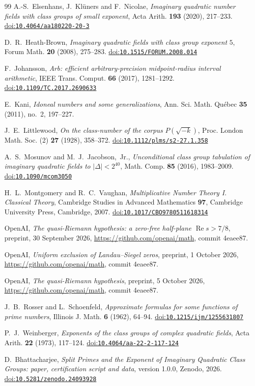 \documentclass[11pt]{amsart}
\theoremstyle{definition}
\theoremstyle{remark}
\numberwithin{equation}{section}
\renewcommand{\Re}{\operatorname{Re}}
\providecommand{\doi}[1]{\href{https://doi.org/#1}{doi:\nolinkurl{#1}}}
\begin{document}
\begin{thebibliography}{99}
 A.-S.~Elsenhans, J.~Kl\"uners and F.~Nicolae, \emph{Imaginary quadratic number fields with class groups of small exponent}, Acta Arith. \textbf{193} (2020), 217--233. \doi{10.4064/aa180220-20-3}

 D.~R.~Heath-Brown, \emph{Imaginary quadratic fields with class group exponent $5$}, Forum Math. \textbf{20} (2008), 275--283. \doi{10.1515/FORUM.2008.014}

 F.~Johansson, \emph{Arb: efficient arbitrary-precision midpoint-radius interval arithmetic}, IEEE Trans. Comput. \textbf{66} (2017), 1281--1292. \doi{10.1109/TC.2017.2690633}

 E.~Kani, \emph{Idoneal numbers and some generalizations}, Ann. Sci. Math. Qu\'ebec \textbf{35} (2011), no.~2, 197--227.

 J.~E.~Littlewood, \emph{On the class-number of the corpus $P(\sqrt{-k})$}, Proc. London Math. Soc. (2) \textbf{27} (1928), 358--372. \doi{10.1112/plms/s2-27.1.358}

 A.~S.~Mosunov and M.~J.~Jacobson,~Jr., \emph{Unconditional class group tabulation of imaginary quadratic fields to $|\Delta|<2^{40}$}, Math. Comp. \textbf{85} (2016), 1983--2009. \doi{10.1090/mcom3050}

 H.~L.~Montgomery and R.~C.~Vaughan, \emph{Multiplicative Number Theory I. Classical Theory}, Cambridge Studies in Advanced Mathematics \textbf{97}, Cambridge University Press, Cambridge, 2007. \doi{10.1017/CBO9780511618314}

 OpenAI, \emph{The quasi-Riemann hypothesis: a zero-free half-plane $\Re s>7/8$}, preprint, 30 September 2026, \url{https://github.com/openai/math}, commit 4eaee87.

 OpenAI, \emph{Uniform exclusion of Landau--Siegel zeros}, preprint, 1 October 2026, \url{https://github.com/openai/math}, commit 4eaee87.

 OpenAI, \emph{The quasi-Riemann hypothesis}, preprint, 5 October 2026, \url{https://github.com/openai/math}, commit 4eaee87.

 J.~B.~Rosser and L.~Schoenfeld, \emph{Approximate formulas for some functions of prime numbers}, Illinois J. Math. \textbf{6} (1962), 64--94. \doi{10.1215/ijm/1255631807}

 P.~J.~Weinberger, \emph{Exponents of the class groups of complex quadratic fields}, Acta Arith. \textbf{22} (1973), 117--124. \doi{10.4064/aa-22-2-117-124}

 D.~Bhattacharjee, \emph{Split Primes and the Exponent of Imaginary Quadratic Class Groups: paper, certification script and data}, version 1.0.0, Zenodo, 2026. \doi{10.5281/zenodo.24093928}

\end{thebibliography}
\endgroup
\end{document}
